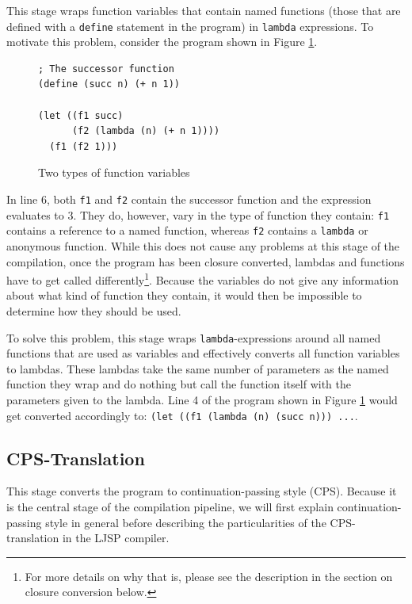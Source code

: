 \documentclass[11pt]{report}
\begin{document}
This stage wraps function variables that contain named functions (those that are defined with a \texttt{define} statement in the program) in \texttt{lambda} expressions. To motivate this problem, consider the program shown in Figure \ref{wrapexampleprog}.

\begin{figure}[ht]
\begin{lstlisting}
; The successor function
(define (succ n) (+ n 1))

(let ((f1 succ)
      (f2 (lambda (n) (+ n 1))))
  (f1 (f2 1)))
\end{lstlisting}
\caption{Two types of function variables}
\label{wrapexampleprog}
\end{figure}

In line 6, both \texttt{f1} and \texttt{f2} contain the successor function and the expression evaluates to 3. They do, however, vary in the type of function they contain: \texttt{f1} contains a reference to a named function, whereas \texttt{f2} contains a \texttt{lambda} or anonymous function. While this does not cause any problems at this stage of the compilation, once the program has been closure converted, lambdas and functions have to get called differently\footnote{For more details on why that is, please see the description in the section on closure conversion below.}. Because the variables do not give any information about what kind of function they contain, it would then be impossible to determine how they should be used.

To solve this problem, this stage wraps \texttt{lambda}-expressions around all named functions that are used as variables and effectively converts all function variables to lambdas. These lambdas take the same number of parameters as the named function they wrap and do nothing but call the function itself with the parameters given to the lambda. Line 4 of the program shown in Figure \ref{wrapexampleprog} would get converted accordingly to: \texttt{(let ((f1 (lambda (n) (succ n))) ...}.



\subsection{CPS-Translation}
This stage converts the program to continuation-passing style (CPS). Because it is the central stage of the compilation pipeline, we will first explain continuation-passing style in general before describing the particularities of the CPS-translation in the LJSP compiler.
\end{document}
